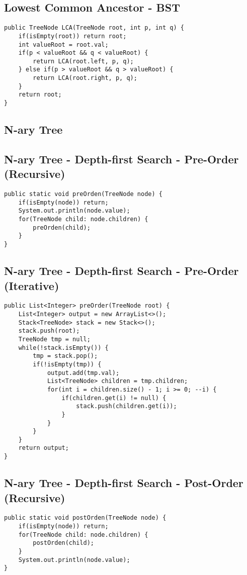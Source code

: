 \documentclass[10pt,letterpaper,twocolumn,twosided]{article}
\begin{document}
\subsection{Lowest Common Ancestor - BST}
\begin{lstlisting}
public TreeNode LCA(TreeNode root, int p, int q) {
    if(isEmpty(root)) return root;
    int valueRoot = root.val;
    if(p < valueRoot && q < valueRoot) {
        return LCA(root.left, p, q);
    } else if(p > valueRoot && q > valueRoot) {
        return LCA(root.right, p, q);
    }
    return root;
}
\end{lstlisting}

\subsection{N-ary Tree}




\subsection{N-ary Tree - Depth-first Search - Pre-Order (Recursive)}
\begin{lstlisting}
public static void preOrden(TreeNode node) {
    if(isEmpty(node)) return;
    System.out.println(node.value);
    for(TreeNode child: node.children) {
        preOrden(child);
    }
}
\end{lstlisting}



\subsection{N-ary Tree - Depth-first Search - Pre-Order (Iterative)}
\begin{lstlisting}
public List<Integer> preOrder(TreeNode root) {
    List<Integer> output = new ArrayList<>();
    Stack<TreeNode> stack = new Stack<>();
    stack.push(root);
    TreeNode tmp = null;
    while(!stack.isEmpty()) {
        tmp = stack.pop();
        if(!isEmpty(tmp)) {
            output.add(tmp.val);
            List<TreeNode> children = tmp.children;
            for(int i = children.size() - 1; i >= 0; --i) {
                if(children.get(i) != null) {
                    stack.push(children.get(i));    
                }
            }
        }
    }
    return output;
}
\end{lstlisting}




\subsection{N-ary Tree - Depth-first Search - Post-Order (Recursive)}
\begin{lstlisting}
public static void postOrden(TreeNode node) {
    if(isEmpty(node)) return;
    for(TreeNode child: node.children) {
        postOrden(child);
    }
    System.out.println(node.value);
}
\end{lstlisting}
\end{document}
